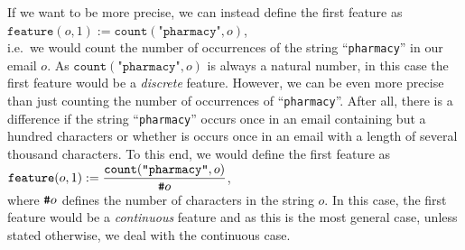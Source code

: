 If we want to be more precise, we can instead define the first feature as
\\[0.2cm]
\hspace*{1.3cm}
$\texttt{feature}(o, 1) := \mathtt{count}(\texttt{"pharmacy"}, o)$,
\\[0.2cm]
i.e.~we would count the number of occurrences of the string ``\texttt{pharmacy}'' in our email $o$.   
As $\mathtt{count}(\texttt{"pharmacy"}, o)$ is always a natural number, in this case the first feature would be a
 \emph{discrete} feature.  However, we can be even more precise than just counting the number of occurrences of
 ``\texttt{pharmacy}''.  After all, there is a difference if the string ``\texttt{pharmacy}'' occurs once in an email
 containing but a hundred characters or whether is occurs once in an email with a length of several thousand
 characters.  To this end, we would define the first feature as
\\[0.2cm]
\hspace*{1.3cm}
$\displaystyle \texttt{feature}(o, 1) := \frac{\mathtt{count}(\texttt{"pharmacy"}, o)}{\texttt{\#} o}$, 
\\[0.2cm]
where $\texttt{\#} o$ defines the number of characters in the string $o$.  In this case, the first feature would be a
\emph{continuous} feature and as this is the most general case, unless stated otherwise, we deal with the continuous
case. 

